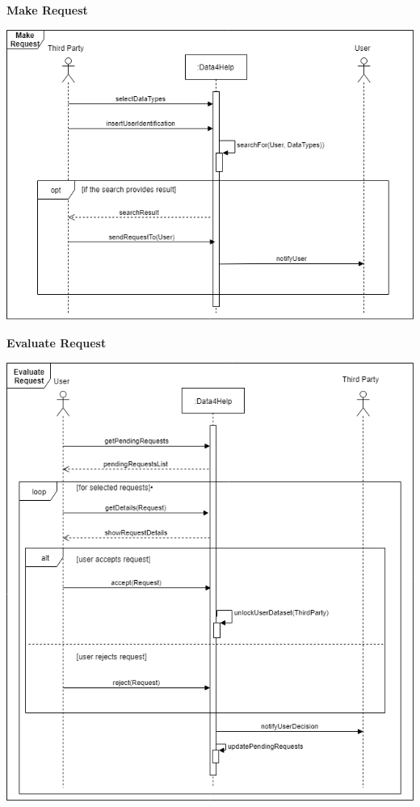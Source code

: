 \textbf{Make Request}\par
\begin{center}
	\includegraphics[scale=0.6]{Images/UML/MakeRequestSeq.png}
\end{center}

\textbf{Evaluate Request} \par
\begin{center}
	\includegraphics[scale=0.6]{Images/UML/EvaluateRequestSeq.png}
\end{center}

